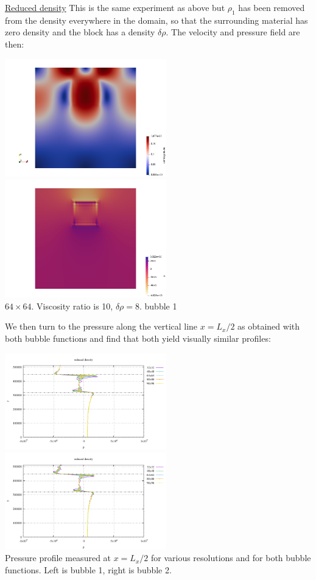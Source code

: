 \underline{Reduced density} 
This is the same experiment as above but $\rho_1$ has been removed from the density
everywhere in the domain, so that the surrounding material has zero density 
and the block has a density $\delta \rho$.
The velocity and pressure field are then:

\begin{center}
\includegraphics[width=7cm]{python_codes/fieldstone_72/results/block/reduced/vel}
\includegraphics[width=7cm]{python_codes/fieldstone_72/results/block/reduced/p}\\
{\captionfont $64\times 64$. Viscosity ratio is 10, $\delta \rho=8$. bubble 1}
\end{center}

We then turn to the pressure along the vertical line $x=L_x/2$ as obtained with 
both bubble functions and find that both yield visually similar profiles:

\begin{center}
\includegraphics[width=7cm]{python_codes/fieldstone_72/results/block/reduced/plines_b1}
\includegraphics[width=7cm]{python_codes/fieldstone_72/results/block/reduced/plines_b2}\\
{\captionfont Pressure profile measured at $x=L_x/2$ for various resolutions and for both bubble functions.
Left is bubble 1, right is bubble 2.}
\end{center}

